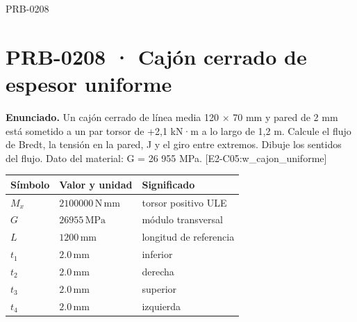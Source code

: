 \begin{studiumworked}{PRB-0208}

\section{PRB-0208 · Cajón cerrado de espesor uniforme}

\textbf{Enunciado.} Un cajón cerrado de línea media 120 \ensuremath{\times} 70 mm y pared de 2 mm está sometido a un par torsor de +2,1 kN·m a lo largo de 1,2 m. Calcule el flujo de Bredt, la tensión en la pared, J y el giro entre extremos. Dibuje los sentidos del flujo. Dato del material: G = 26 955 MPa. [E2-C05:w\_cajon\_uniforme]

\par\medskip\noindent\begin{tabular}{@{}p{.18\linewidth}p{.26\linewidth}p{.48\linewidth}@{}}
\toprule Símbolo & Valor y unidad & Significado\\\midrule
$M_{x}$ & $2100000\,\mathrm{N\,mm}$ & torsor positivo ULE\\
$G$ & $26955\,\mathrm{MPa}$ & módulo transversal\\
$L$ & $1200\,\mathrm{mm}$ & longitud de referencia\\
$t_{1}$ & $2.0\,\mathrm{mm}$ & inferior\\
$t_{2}$ & $2.0\,\mathrm{mm}$ & derecha\\
$t_{3}$ & $2.0\,\mathrm{mm}$ & superior\\
$t_{4}$ & $2.0\,\mathrm{mm}$ & izquierda\\
\bottomrule\end{tabular}\par\medskip


\end{studiumworked}
